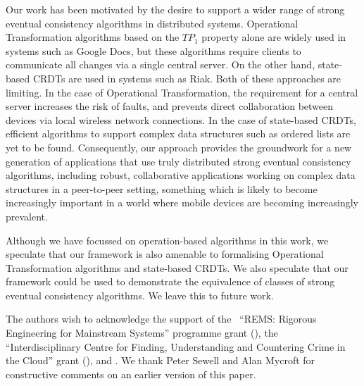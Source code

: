 \documentclass[acmlarge,review,anonymous]{acmart}
\begin{document}
Our work has been motivated by the desire to support a wider range of strong eventual consistency algorithms in distributed systems.
Operational Transformation algorithms based on the $\mathit{TP}_1$ property alone are widely used in systems such as Google Docs, but these algorithms require clients to communicate all changes via a single central server.
On the other hand, state-based CRDTs are used in systems such as Riak.
Both of these approaches are limiting.
In the case of Operational Transformation, the requirement for a central server increases the risk of faults, and prevents direct collaboration between devices via local wireless network connections.
In the case of state-based CRDTs, efficient algorithms to support complex data structures such as ordered lists are yet to be found.
Consequently, our approach provides the groundwork for a new generation of applications that use truly distributed strong eventual consistency algorithms, including robust, collaborative applications working on complex data structures in a peer-to-peer setting, something which is likely to become increasingly important in a world where mobile devices are becoming increasingly prevalent.

Although we have focussed on operation-based algorithms in this work, we speculate that our framework is also amenable to formalising Operational Transformation algorithms and state-based CRDTs.
We also speculate that our framework could be used to demonstrate the equivalence of classes of strong eventual consistency algorithms.
We leave this to future work.

\begin{acks}
    The authors wish to acknowledge the support of the~ ``REMS: Rigorous Engineering for Mainstream Systems'' programme grant (),
    the~ ``Interdisciplinary Centre for Finding, Understanding and Countering Crime in the Cloud'' grant (),
    and .
    We thank Peter Sewell and Alan Mycroft for constructive comments on an earlier version of this paper.
\end{acks}

\pagebreak

{}
\end{document}
